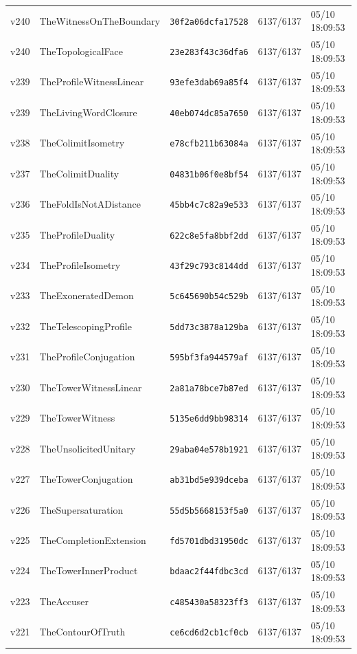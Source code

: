 \documentclass[11pt]{article}
\theoremstyle{definition}\newtheorem{deriv}{Derivação}
\begin{document}
{\begin{longtable}{@{}lllll@{}}
v240 & TheWitnessOnTheBoundary & \texttt{30f2a06dcfa17528} & 6137/6137 & 05/10 18:09:53 \\
v240 & TheTopologicalFace & \texttt{23e283f43c36dfa6} & 6137/6137 & 05/10 18:09:53 \\
v239 & TheProfileWitnessLinear & \texttt{93efe3dab69a85f4} & 6137/6137 & 05/10 18:09:53 \\
v239 & TheLivingWordClosure & \texttt{40eb074dc85a7650} & 6137/6137 & 05/10 18:09:53 \\
v238 & TheColimitIsometry & \texttt{e78cfb211b63084a} & 6137/6137 & 05/10 18:09:53 \\
v237 & TheColimitDuality & \texttt{04831b06f0e8bf54} & 6137/6137 & 05/10 18:09:53 \\
v236 & TheFoldIsNotADistance & \texttt{45bb4c7c82a9e533} & 6137/6137 & 05/10 18:09:53 \\
v235 & TheProfileDuality & \texttt{622c8e5fa8bbf2dd} & 6137/6137 & 05/10 18:09:53 \\
v234 & TheProfileIsometry & \texttt{43f29c793c8144dd} & 6137/6137 & 05/10 18:09:53 \\
v233 & TheExoneratedDemon & \texttt{5c645690b54c529b} & 6137/6137 & 05/10 18:09:53 \\
v232 & TheTelescopingProfile & \texttt{5dd73c3878a129ba} & 6137/6137 & 05/10 18:09:53 \\
v231 & TheProfileConjugation & \texttt{595bf3fa944579af} & 6137/6137 & 05/10 18:09:53 \\
v230 & TheTowerWitnessLinear & \texttt{2a81a78bce7b87ed} & 6137/6137 & 05/10 18:09:53 \\
v229 & TheTowerWitness & \texttt{5135e6dd9bb98314} & 6137/6137 & 05/10 18:09:53 \\
v228 & TheUnsolicitedUnitary & \texttt{29aba04e578b1921} & 6137/6137 & 05/10 18:09:53 \\
v227 & TheTowerConjugation & \texttt{ab31bd5e939dceba} & 6137/6137 & 05/10 18:09:53 \\
v226 & TheSupersaturation & \texttt{55d5b5668153f5a0} & 6137/6137 & 05/10 18:09:53 \\
v225 & TheCompletionExtension & \texttt{fd5701dbd31950dc} & 6137/6137 & 05/10 18:09:53 \\
v224 & TheTowerInnerProduct & \texttt{bdaac2f44fdbc3cd} & 6137/6137 & 05/10 18:09:53 \\
v223 & TheAccuser & \texttt{c485430a58323ff3} & 6137/6137 & 05/10 18:09:53 \\
v221 & TheContourOfTruth & \texttt{ce6cd6d2cb1cf0cb} & 6137/6137 & 05/10 18:09:53 \\

\end{longtable}}
\end{document}
